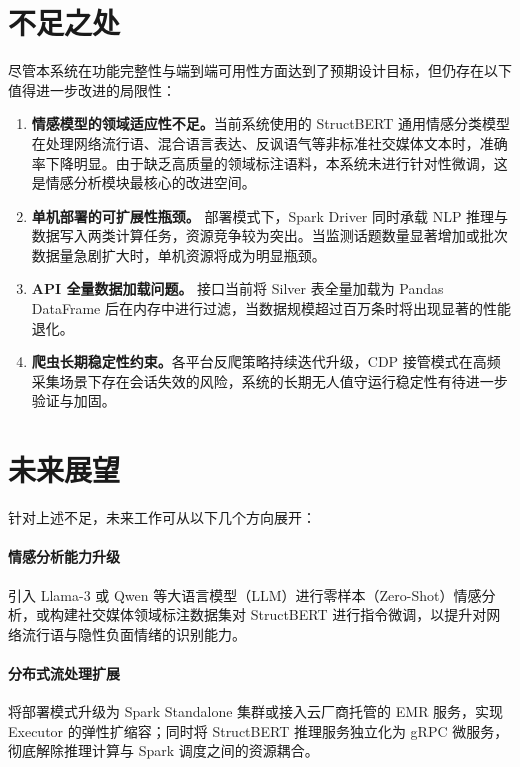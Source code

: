 \section{不足之处}

尽管本系统在功能完整性与端到端可用性方面达到了预期设计目标，但仍存在以下值得进一步改进的局限性：

\begin{enumerate}
  \item \textbf{情感模型的领域适应性不足。}当前系统使用的 StructBERT 通用情感分类模型在处理网络流行语、混合语言表达、反讽语气等非标准社交媒体文本时，准确率下降明显。由于缺乏高质量的领域标注语料，本系统未进行针对性微调，这是情感分析模块最核心的改进空间。

  \item \textbf{单机部署的可扩展性瓶颈。} 部署模式下，Spark Driver 同时承载 NLP 推理与数据写入两类计算任务，资源竞争较为突出。当监测话题数量显著增加或批次数据量急剧扩大时，单机资源将成为明显瓶颈。

  \item \textbf{API 全量数据加载问题。} 接口当前将 Silver 表全量加载为 Pandas DataFrame 后在内存中进行过滤，当数据规模超过百万条时将出现显著的性能退化。

  \item \textbf{爬虫长期稳定性约束。}各平台反爬策略持续迭代升级，CDP 接管模式在高频采集场景下存在会话失效的风险，系统的长期无人值守运行稳定性有待进一步验证与加固。
\end{enumerate}

\section{未来展望}

针对上述不足，未来工作可从以下几个方向展开：

\paragraph{情感分析能力升级}引入 Llama-3 或 Qwen 等大语言模型（LLM）进行零样本（Zero-Shot）情感分析，或构建社交媒体领域标注数据集对 StructBERT 进行指令微调，以提升对网络流行语与隐性负面情绪的识别能力。

\paragraph{分布式流处理扩展}将部署模式升级为 Spark Standalone 集群或接入云厂商托管的 EMR 服务，实现 Executor 的弹性扩缩容；同时将 StructBERT 推理服务独立化为 gRPC 微服务，彻底解除推理计算与 Spark 调度之间的资源耦合。

